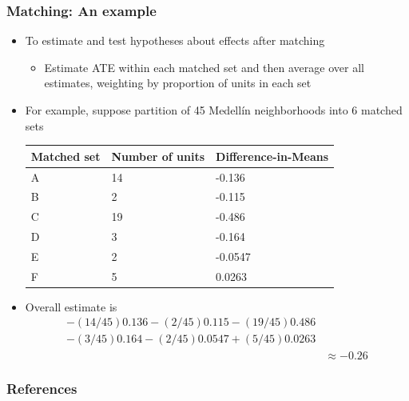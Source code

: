 \documentclass[table, xcolor = {dvipsnames}, 9pt]{beamer}
\theoremstyle{plain}
\begin{document}
\begin{frame}[t]
\frametitle{Matching: An example}
\vfill
\begin{itemize} \vfill
\item To estimate and test hypotheses about effects after matching \vfill
\begin{itemize} \vfill
\item Estimate ATE within each matched set and then average over all estimates, weighting by proportion of units in each set \vfill
\end{itemize} \vfill
\item For example, suppose partition of 45 Medell\'{i}n neighborhoods into $6$ matched sets \vfill
 \begin{table}[H]
\centering
\begin{tabular}{lll}
\hline
Matched set & Number of units & Difference-in-Means \\ \hline
A & 14 & -0.136  \\
B & 2  & -0.115 \\
C & 19 & -0.486 \\
D & 3  & -0.164 \\
E & 2  & -0.0547 \\
F & 5  & 0.0263 \\
\hline
\end{tabular}
\end{table} \vfill
\item Overall estimate is \vfill
\footnotesize
\begin{align*}
-\left(14/45\right)0.136 - \left(2/45\right)0.115 - \left(19/45\right)0.486 & \\
- \left(3/45\right)0.164 - \left(2/45\right)0.0547 + \left(5/45\right)0.0263 \\ 
& \approx -0.26 
\end{align*}
\normalsize
\end{itemize} \vfill
\end{frame}
\begin{frame}[allowframebreaks]
\frametitle{References} 
\scriptsize

\end{frame}
\end{document}
